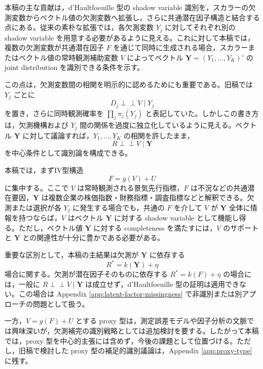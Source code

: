 \documentclass[10pt,a4paper]{article}
\newcommand{\indep}{\mathrel{\perp\!\!\!\perp}}
\newcommand{\1}{\mathbf{1}}
\newcommand{\Y}{\bm{Y}}
\begin{document}
本稿の主な貢献は，d'Haultfoeuille 型の shadow variable 識別を，スカラーの欠測変数からベクトル値の欠測変数へ拡張し，さらに共通潜在因子構造と結合する点にある。従来の素朴な拡張では，各欠測変数 $Y_j$ に対してそれぞれ別の shadow variable を用意する必要があるように見える。これに対して本稿では，複数の欠測変数が共通潜在因子 $F$ を通じて同時に生成される場合，スカラーまたはベクトル値の常時観測補助変数 $V$ によってベクトル $\Y=(Y_1,\ldots,Y_K)'$ の joint distribution を識別できる条件を示す。

この点は，欠測変数間の相関を明示的に認めるためにも重要である。旧稿では $Y_j$ ごとに
\begin{equation}
  D_j\indep V\mid Y_j
\end{equation}
を置き，さらに同時観測確率を $\prod_j \pi_j(Y_j)$ と表記していた。しかしこの書き方は，欠測機構および $Y_j$ 間の関係を過度に独立化しているように見える。ベクトル $\Y$ に対して議論すれば，$Y_1,\ldots,Y_K$ の相関を許したまま，
\begin{equation}
  R\indep V\mid \Y
  \label{eq:intro-vector-shadow}
\end{equation}
を中心条件として識別論を構成できる。

本稿では，まずIV型構造
\begin{equation}
  F=g(V)+U
  \label{eq:intro-iv-latent}
\end{equation}
に集中する。ここで $V$ は常時観測される景気先行指標，$F$ は不況などの共通潜在要因，$\Y$ は複数企業の株価指数・財務指標・調査指標などと解釈できる。欠測または選択が各 $Y_j$ に発生する場合でも，共通の $F$ を介して $V$ が $\Y$ 全体に情報を持つならば，$V$ はベクトル $\Y$ に対する shadow variable として機能し得る。ただし，ベクトル値 $\Y$ に対する completeness を満たすには，$V$ のサポートと $\Y$ との関連性が十分に豊かである必要がある。

重要な区別として，本稿の主結果は欠測が $\Y$ に依存する
\begin{equation}
  R^*=k(\Y)+\eta
\end{equation}
場合に関する。欠測が潜在因子そのものに依存する $R^*=k(F)+\eta$ の場合には，一般に $R\indep V\mid \Y$ は成立せず，d'Haultfoeuille 型の証明は適用できない。この場合は Appendix \ref{app:latent-factor-missingness} で非識別または別アプローチの問題として扱う。

一方，$V=g(F)+U$ とする proxy 型は，測定誤差モデルや因子分析の文脈では興味深いが，欠測補完の識別戦略としては追加検討を要する。したがって本稿では，proxy 型を中心的主張には含めず，今後の課題として位置づける。ただし，旧稿で検討した proxy 型の補足的識別議論は，Appendix \ref{app:proxy-type} に残す。
\end{document}
